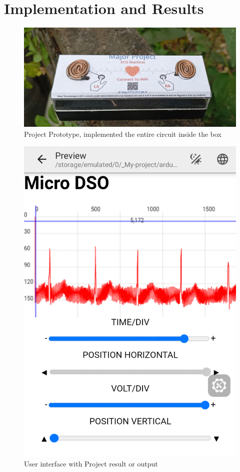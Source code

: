 \chapter{Implementation and Results}
\begin{figure}[H]
    \centering
    \includegraphics[scale=0.1]{images/proto.jpg}
    \caption{Project Prototype, implemented the entire circuit inside the box}
    \label{fig:proj_proto}
\end{figure}
\begin{figure}[H]
    \centering
    \includegraphics[scale=0.3]{images/result.png}
    \caption{User interface with Project result or output}
    \label{fig:proj_result}
\end{figure}


